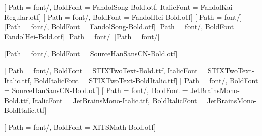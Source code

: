 
[        %
    Path = font/,
    BoldFont = FandolSong-Bold.otf,             %
    ItalicFont = FandolKai-Regular.otf]         %
[         %
    Path = font/,
    BoldFont = FandolHei-Bold.otf]
[        %
    Path = font/]
[Path = font/, BoldFont = FandolSong-Bold.otf]
[Path = font/, BoldFont = FandolHei-Bold.otf]
[Path = font/]
[Path = font/]

[Path = font/, BoldFont = SourceHanSansCN-Bold.otf]
\renewcommand{\coverfont}{\CJKfamily{zhcover}}   %

\setmainfont{STIXTwoText-Regular.ttf}[
    Path = font/,
    BoldFont = STIXTwoText-Bold.ttf,
    ItalicFont = STIXTwoText-Italic.ttf,
    BoldItalicFont = STIXTwoText-BoldItalic.ttf]
\setsansfont{SourceHanSansCN-Regular.otf}[
    Path = font/, BoldFont = SourceHanSansCN-Bold.otf]
\setmonofont{JetBrainsMono-Regular.ttf}[
    Path = font/,
    BoldFont = JetBrainsMono-Bold.ttf,
    ItalicFont = JetBrainsMono-Italic.ttf,
    BoldItalicFont = JetBrainsMono-BoldItalic.ttf]

\RequirePackage{unicode-math}                   %
[
    Path = font/, BoldFont = XITSMath-Bold.otf]
\renewcommand{\qedsymbol}{\ensuremath{\mdlgwhtsquare}}

